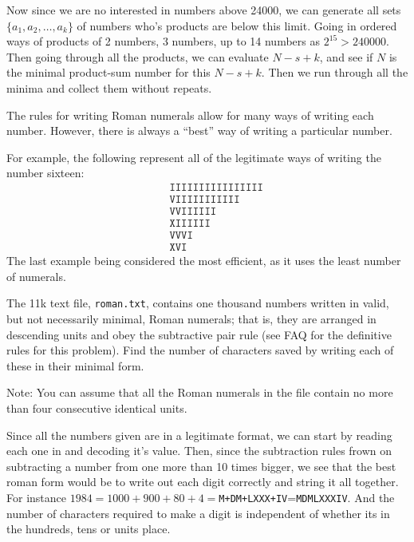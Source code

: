 Now since we are no interested in numbers above 24000, we can generate all sets $\{a_1, a_2, \dots, a_k\}$ of numbers who's products are below this limit.  Going in ordered ways of products of 2 numbers, 3 numbers, up to 14 numbers as $2^{15} > 240000$.  Then going through all the products, we can evaluate $N-s+k$, and see if $N$ is the minimal product-sum number for this $N-s+k$.  Then we run through all the minima and collect them without repeats.




The rules for writing Roman numerals allow for many ways of writing each number. However, there is always a ``best'' way of writing a particular number.

For example, the following represent all of the legitimate ways of writing the number sixteen:
\begin{eqnarray*}
&&\texttt{IIIIIIIIIIIIIIII}    \\
&&\texttt{VIIIIIIIIIII    }    \\
&&\texttt{VVIIIIII        }    \\
&&\texttt{XIIIIII         }    \\
&&\texttt{VVVI            }    \\
&&\texttt{XVI             }
\end{eqnarray*}
The last example being considered the most efficient, as it uses the least number of numerals.

The 11k text file, \verb"roman.txt", contains one thousand numbers written in valid, but not necessarily minimal, Roman numerals; that is, they are arranged in descending units and obey the subtractive pair rule (see FAQ for the definitive rules for this problem).  Find the number of characters saved by writing each of these in their minimal form.

\footnotesize
Note: You can assume that all the Roman numerals in the file contain no more than four consecutive identical units.
\normalsize

Since all the numbers given are in a legitimate format, we can start by reading each one in and decoding it's value.  Then, since the subtraction rules frown on subtracting a number from one more than 10 times bigger, we see that the best roman form would be to write out each digit correctly and string it all together.  For instance $1984 = 1000+900+80+4 = $\verb"M+DM+LXXX+IV"=\verb"MDMLXXXIV".  And the number of characters required to make a digit is independent of whether its in the hundreds, tens or units place.

